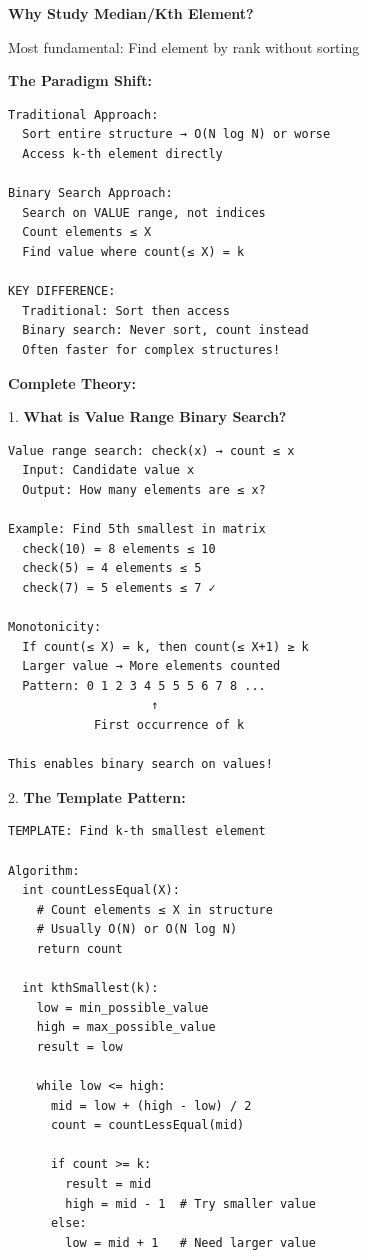 \documentclass[11pt,a4paper,oneside]{book}
\begin{document}
\begin{tcolorbox}[
    enhanced,breakable,
    colback=white,
    colframe=deepblue,
    boxrule=1.5pt,
    arc=3mm,
    title=\textbf{Binary Search on Value Range}
]
\textbf{Why Study Median/Kth Element?}

Most fundamental: Find element by rank without sorting

\textbf{The Paradigm Shift:}
\begin{verbatim}
Traditional Approach:
  Sort entire structure → O(N log N) or worse
  Access k-th element directly
  
Binary Search Approach:
  Search on VALUE range, not indices
  Count elements ≤ X
  Find value where count(≤ X) = k
  
KEY DIFFERENCE:
  Traditional: Sort then access
  Binary search: Never sort, count instead
  Often faster for complex structures!
\end{verbatim}

\textbf{Complete Theory:}

1. \textbf{What is Value Range Binary Search?}
\begin{verbatim}
Value range search: check(x) → count ≤ x
  Input: Candidate value x
  Output: How many elements are ≤ x?

Example: Find 5th smallest in matrix
  check(10) = 8 elements ≤ 10
  check(5) = 4 elements ≤ 5
  check(7) = 5 elements ≤ 7 ✓

Monotonicity:
  If count(≤ X) = k, then count(≤ X+1) ≥ k
  Larger value → More elements counted
  Pattern: 0 1 2 3 4 5 5 5 6 7 8 ...
                    ↑
            First occurrence of k

This enables binary search on values!
\end{verbatim}

2. \textbf{The Template Pattern:}
\begin{verbatim}
TEMPLATE: Find k-th smallest element

Algorithm:
  int countLessEqual(X):
    # Count elements ≤ X in structure
    # Usually O(N) or O(N log N)
    return count
  
  int kthSmallest(k):
    low = min_possible_value
    high = max_possible_value
    result = low
    
    while low <= high:
      mid = low + (high - low) / 2
      count = countLessEqual(mid)
      
      if count >= k:
        result = mid
        high = mid - 1  # Try smaller value
      else:
        low = mid + 1   # Need larger value
    

\end{verbatim}
\end{tcolorbox}
\end{document}
